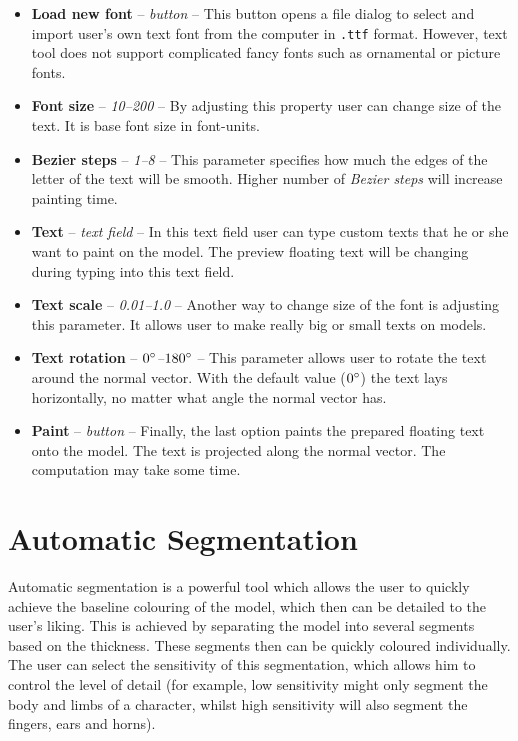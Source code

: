 \begin{itemize}

\item \textbf{Load new font} -- \textit{button} -- This button opens a file dialog to select and import user's own text font from the computer in \texttt{.ttf} format. However, text tool does not support complicated fancy fonts such as ornamental or picture fonts.

\item \textbf{Font size} -- \textit{10--200} -- By adjusting this property user can change size of the text. It is base font size in font-units.

\item \textbf{Bezier steps} -- \textit{1--8} -- This parameter specifies how much the edges of the letter of the text will be smooth. Higher number of \textit{Bezier steps} will increase painting time.

\item \textbf{Text} -- \textit{text field} -- In this text field user can type custom texts that he or she want to paint on the model. The preview floating text will be changing during typing into this text field.

\item \textbf{Text scale} -- \textit{0.01--1.0} -- Another way to change size of the font is adjusting this parameter. It allows user to make really big or small texts on models.

\item \textbf{Text rotation} -- \textit{$0\degree$--$180\degree$} -- This parameter allows user to rotate the text around the normal vector. With the default value ($0\degree$) the text lays horizontally, no matter what angle the normal vector has.

\item \textbf{Paint} -- \textit{button} -- Finally, the last option paints the prepared floating text onto the model. The text is projected along the normal vector. The computation may take some time.

\end{itemize}


\section{Automatic Segmentation}

Automatic segmentation is a powerful tool which allows the user to quickly achieve the baseline colouring of the model, which then can be detailed to the user's liking. This is achieved by separating the model into several segments based on the thickness. These segments then can be quickly coloured individually. The user can select the sensitivity of this segmentation, which allows him to control the level of detail (for example, low sensitivity might only segment the body and limbs of a character, whilst high sensitivity will also segment the fingers, ears and horns).

